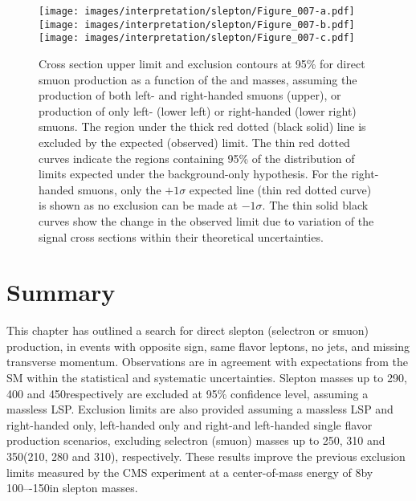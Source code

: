  \begin{figure}[htbp]
\centering
\texttt{[image: images/interpretation/slepton/Figure\_007-a.pdf]} \\
\texttt{[image: images/interpretation/slepton/Figure\_007-b.pdf]}
\texttt{[image: images/interpretation/slepton/Figure\_007-c.pdf]}
\caption{\label{fig:TOTmm}
Cross section upper limit and exclusion contours at 95\% \CL for direct smuon production
as a function of the \lsp and \slep masses, assuming the production of both left- and right-handed smuons
(upper), or production of only left- (lower left) or right-handed (lower right) smuons.
The region under the thick red dotted (black solid) line is excluded by the expected (observed) limit.
The thin red dotted curves indicate the regions containing 95\% of the distribution of limits
expected under the background-only hypothesis. For the right-handed smuons, only the $+1\sigma$ expected line (thin red dotted curve) is shown as no exclusion can be made at $-1\sigma$.
The thin solid black curves show the change in the observed limit due to
variation of the signal cross sections within their theoretical uncertainties.
}
\end{figure}
\section{Summary}
\noindent
\justify
This chapter has outlined a search for direct slepton (selectron or smuon) production, in events with opposite sign, same flavor leptons, no jets, and missing transverse momentum.
Observations are in agreement with expectations from the SM within the statistical and systematic uncertainties.
Slepton masses up to 290, 400 and 450\GeV respectively are excluded at 95\% confidence level, assuming a massless LSP. 
Exclusion limits are also provided assuming a massless LSP and right-handed only, left-handed only and right-and left-handed single flavor production scenarios, excluding selectron (smuon) masses up to 250, 310 and 350\GeV (210, 280 and 310\GeV), respectively.
These results improve the previous exclusion limits measured by the CMS experiment at a center-of-mass energy of 8\TeV by 100–-150\GeV in slepton masses.
